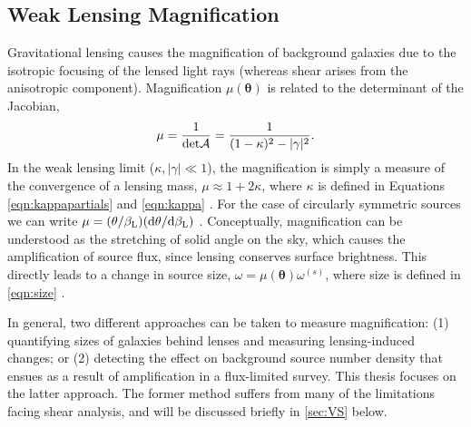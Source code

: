 
\subsection{Weak Lensing Magnification}
\label{sec:Mag}

Gravitational lensing causes the magnification of background galaxies due to the isotropic focusing of the lensed light rays (whereas shear arises from the anisotropic component). Magnification $\mu(\bm{\theta})$ is related to the determinant of the Jacobian, 
\begin{equation}
\mu  = \frac{1}{{\rm det}{\cal A}} = \frac{1}{(1-\kappa)^2 - |\gamma|^2}.
\end{equation}
In the weak lensing limit ($\kappa, |\gamma| \ll 1$), the magnification is simply a measure of the convergence of a lensing mass, $\mu \approx 1+2\kappa$, where $\kappa$ is defined in Equations \ref{eqn:kappapartials} and \ref{eqn:kappa} \citep{Schneider06_IntroGravLensCosmology}. For the case of circularly symmetric sources we can write $\mu = (\theta/\beta_{\rm L})({\rm d}\theta/{\rm d}\beta_{\rm L})$
\citep{NarayanBartelmann96}. Conceptually, magnification can be understood as the stretching of solid angle on the sky, which causes the amplification of source flux, since lensing conserves surface brightness. This directly leads to a change in source size, $\omega = \mu(\bm{\theta}) \omega^{(s)}$, where size is defined in \autoref{eqn:size} \citep{BS01}.

In general, two different approaches can be taken to measure magnification: (1) quantifying sizes of galaxies behind lenses and measuring lensing-induced changes; or (2) detecting the effect on background source number density that ensues as a result of amplification in a flux-limited survey. This thesis focuses on the latter approach. The former method suffers from many of the limitations facing shear analysis, and will be discussed briefly in \autoref{sec:VS} below. 

